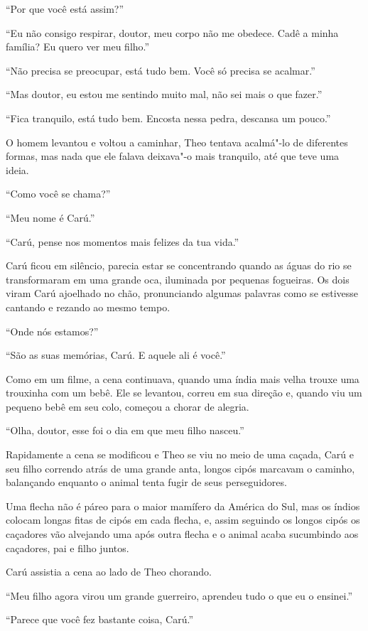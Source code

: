 ``Por que você está assim?''

``Eu não consigo respirar, doutor, meu corpo não me obedece. Cadê a
minha família? Eu quero ver meu filho.''

``Não precisa se preocupar, está tudo bem. Você só precisa se acalmar.''

``Mas doutor, eu estou me sentindo muito mal, não sei mais o que
fazer.''

``Fica tranquilo, está tudo bem. Encosta nessa pedra, descansa um
pouco.''

O homem levantou e voltou a caminhar, Theo tentava acalmá"-lo de
diferentes formas, mas nada que ele falava deixava"-o mais tranquilo, até
que teve uma ideia.

``Como você se chama?''

``Meu nome é Carú.''

``Carú, pense nos momentos mais felizes da tua vida.''

Carú ficou em silêncio, parecia estar se concentrando quando as águas do
rio se transformaram em uma grande oca, iluminada por pequenas
fogueiras. Os dois viram Carú ajoelhado no chão, pronunciando algumas
palavras como se estivesse cantando e rezando ao mesmo tempo.

``Onde nós estamos?''

``São as suas memórias, Carú. E aquele ali é você.''

Como em um filme, a cena continuava, quando uma índia mais velha trouxe
uma trouxinha com um bebê. Ele se levantou, correu em sua direção e,
quando viu um pequeno bebê em seu colo, começou a chorar de alegria.

``Olha, doutor, esse foi o dia em que meu filho nasceu.''

Rapidamente a cena se modificou e Theo se viu no meio de uma caçada,
Carú e seu filho correndo atrás de uma grande anta, longos cipós
marcavam o caminho, balançando enquanto o animal tenta fugir de seus
perseguidores.

Uma flecha não é páreo para o maior mamífero da América do Sul, mas os
índios colocam longas fitas de cipós em cada flecha, e, assim seguindo
os longos cipós os caçadores vão alvejando uma após outra flecha e o
animal acaba sucumbindo aos caçadores, pai e filho juntos.

Carú assistia a cena ao lado de Theo chorando.

``Meu filho agora virou um grande guerreiro, aprendeu tudo o que eu o
ensinei.''

``Parece que você fez bastante coisa, Carú.''

